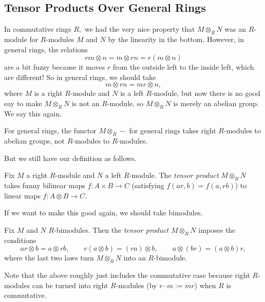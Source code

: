 \documentclass[../notes.tex]{subfiles}
\begin{document}
\subsection{Tensor Products Over General Rings}
In commutative rings $R,$ we had the very nice property that $M\otimes_RN$ was an $R$-module for $R$-modules $M$ and $N$ by the linearity in the bottom. However, in general rings, the relations
\[rm\otimes n=m\otimes rn=r(m\otimes n)\]
are a bit fuzzy because it moves $r$ from the outside left to the inside left, which are different! So in general rings, we should take
\[m\otimes rn=mr\otimes n,\]
where $M$ is a right $R$-module and $N$ is a left $R$-module, but now there is no good eay to make $M\otimes_RN$ is not an $R$-module, so $M\otimes_RN$ is merely an abelian group. We say this again.
\begin{warn}
	For general rings, the functor $M\otimes_R-$ for general rings takes right $R$-modules to abelian groups, not $R$-modules to $R$-modules.
\end{warn}
But we still have our definition as follows.
\begin{definition}
	Fix $M$ a right $R$-module and $N$ a left $R$-module. The \textit{tensor product} $M\otimes_RN$ takes funny bilinear maps $f:A\times B\to C$ (satisfying $f(ar,b)=f(a,rb)$) to linear maps $f:A\otimes B\to C.$
\end{definition}
If we want to make this good again, we should take bimodules.
\begin{definition}
	Fix $M$ and $N$ $R$-bimodules. Then the \textit{tensor product} $M\otimes_RN$ imposes the conditions
	\[ar\otimes b=a\otimes rb,\qquad r(a\otimes b)=(ra)\otimes b,\qquad a\otimes(br)=(a\otimes b)r,\]
	where the last two laws turn $M\otimes_RN$ into an $R$-bimodule.
\end{definition}
Note that the above roughly just includes the commutative case because right $R$-modules can be turned into right $R$-modules (by $r\cdot m:=mr$) when $R$ is commutative.
\end{document}
